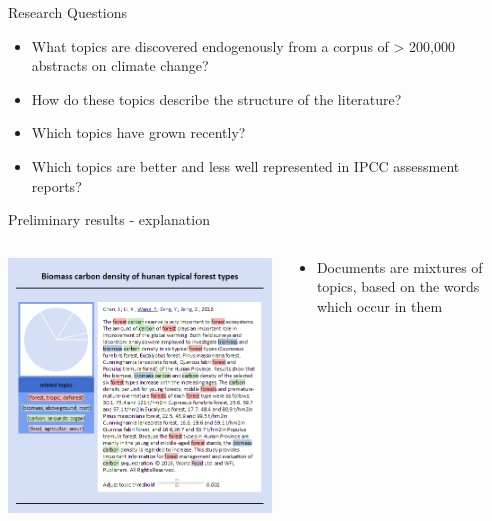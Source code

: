 \documentclass[9pt]{beamer}
\begin{document}
\begin{frame}{Research Questions}
\begin{itemize}
	\item What topics are discovered endogenously from a corpus of > 200,000 abstracts on climate change?
	\item How do these topics describe the structure of the literature?
	\item Which topics have grown recently?
	\item Which topics are better and less well represented in IPCC assessment reports?
\end{itemize}
\end{frame}


\begin{frame}{Preliminary results - explanation}

\begin{columns}
	\begin{column}{0.5\linewidth}
		\begin{center}
			\includegraphics[width=\linewidth]{../plots/biomass_eg.png}
		\end{center}
	\end{column}
	\begin{column}{0.5\linewidth}
		\begin{center}
			\begin{itemize}
				\item Documents are mixtures of topics, based on the words which occur in them
			\end{itemize}
		\end{center}
	\end{column}
\end{columns}

\end{frame}
\end{document}
